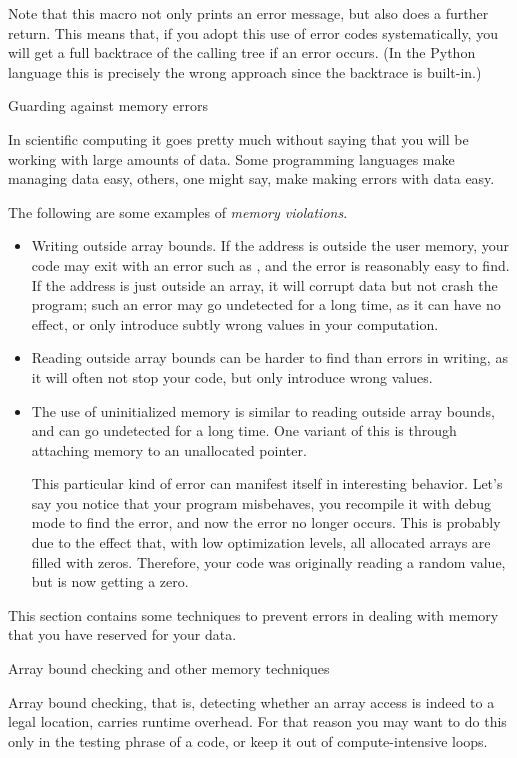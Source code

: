 Note that this macro not only prints an error message, but also does a
further return. This means that, if you adopt this use of error codes
systematically, you will get a full backtrace of the calling tree if
an error occurs. (In the Python language this is precisely the wrong
approach since the backtrace is built-in.)

 {Guarding against memory errors}

In scientific computing it goes pretty much without saying that you
will be working with large amounts of data.
Some programming languages make managing data easy, others, one might
say, make making errors with data easy. 

The following are some examples of \emph{memory violations}.
\begin{itemize}
\item Writing outside array bounds. If the address is outside the user
  memory, your code may exit with an error such as
  , and the error is reasonably easy
  to find. If the address is just outside an array, it will corrupt
  data but not crash the program; such an error may go undetected for
  a long time, as it can have no effect, or only introduce subtly
  wrong values in your computation.
\item Reading outside array bounds can be harder to find than errors
  in writing, as it will often not stop your code, but only introduce
  wrong values.
\item The use of uninitialized memory is similar to reading outside
  array bounds, and can go undetected for a long time. One variant of
  this is through attaching memory to an unallocated pointer.

  This particular kind of error can manifest itself in interesting
  behavior. Let's say you notice that your program misbehaves, you
  recompile it with debug mode to find the error, and now the error no
  longer occurs. This is probably due to the effect that, with low
  optimization levels, all allocated arrays are filled with
  zeros. Therefore, your code was originally reading a random value,
  but is now getting a zero.
\end{itemize}

This section contains some
techniques to prevent errors in dealing with memory that you have
reserved for your data.

 {Array bound checking and other memory techniques}

Array bound checking, that is, detecting whether an array access
is indeed to a legal location, carries runtime overhead.
For that reason you may want to do this only in the testing phrase of a code,
or keep it out of compute-intensive loops.

